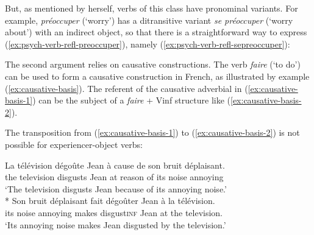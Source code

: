 \eal 
{}
\label{ex:psych-verb-refl-preoccuper}
\zl 

But, as mentioned by \citet{Herschensohn.1992} herself, verbs of this class have pronominal variants. For example, \emph{préoccuper} (`worry') has a ditransitive variant \emph{se préoccuper} (`worry about') with an indirect object, so that there is a straightforward way to express (\ref{ex:psych-verb-refl-preoccuper}), namely (\ref{ex:psych-verb-refl-sepreoccuper}):

\label{ex:psych-verb-refl-sepreoccuper}
\z 

The second argument relies on causative constructions. The verb \emph{faire} (`to do') can be used to form a causative construction in French, as illustrated by example (\ref{ex:causative-basis}). The referent of the causative adverbial in (\ref{ex:causative-basis-1}) can be the subject of a \emph{faire} + Vinf structure like (\ref{ex:causative-basis-2}). 

\eal\label{ex:causative-basis}
\zl 

The transposition from (\ref{ex:causative-basis-1}) to (\ref{ex:causative-basis-2}) is not possible for experiencer-object verbs:

\eal 
\ex \gll La télévision dégoûte Jean à cause de son bruit déplaisant.\\
the television disgusts Jean at reason of its noise annoying\\
\glt `The television disgusts Jean because of its annoying noise.'
\ex \citep[252]{Kayne.1975}\\
* \gll Son bruit déplaisant fait dégoûter Jean à la télévision.\\
its noise annoying makes disgust\textsc{inf} Jean at the television.\\
\glt `Its annoying noise makes Jean disgusted by the television.'
\zl 


